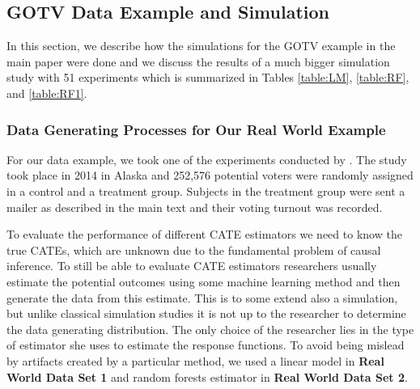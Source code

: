 \subsection{GOTV Data Example and Simulation} \label{section:Appendix-GOTV} \label{sec:simulatedGOTV}
In this section, we describe how the simulations for the GOTV example in the main paper were done and we discuss the results of a much bigger simulation study with 51 experiments which is summarized in Tables \ref{table:LM}, \ref{table:RF}, and \ref{table:RF1}.

\subsubsection{Data Generating Processes for Our Real World Example}
For our data example, we took one of the experiments conducted by \cite{gerber2017generalizability}. The study took place in 2014 in Alaska and 252,576 potential voters were randomly assigned in a control and a treatment group. Subjects in the treatment group were sent a mailer as described in the main text and their voting turnout was recorded. 

To evaluate the performance of different CATE estimators we need to know the true CATEs, which are unknown due to the fundamental problem of causal inference.
To still be able to evaluate CATE estimators researchers usually estimate the potential outcomes using some machine learning method and then generate the data from this estimate. This is to some extend also a simulation, but unlike classical simulation studies it is not up to the researcher to determine the data generating distribution.
The only choice of the researcher lies in the type of estimator she uses to estimate the response functions. To avoid being mislead by artifacts created by a particular method, we used a linear model in \textbf{Real World Data Set 1} and random forests estimator in \textbf{Real World Data Set 2}.

